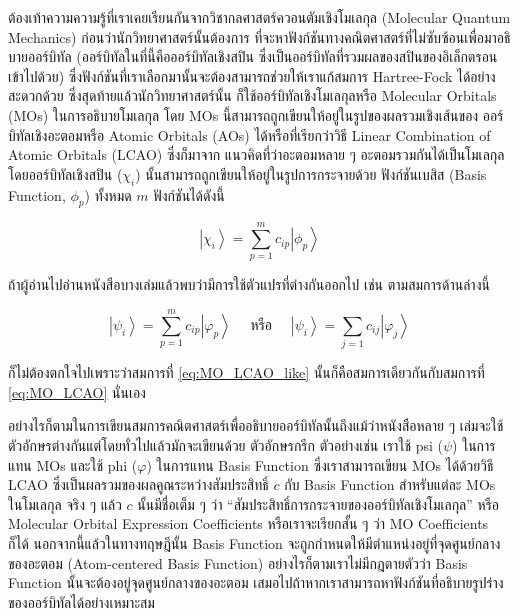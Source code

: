 ต้องเท้าความความรู้ที่เราเคยเรียนกันจากวิชากลศาสตร์ควอนตัมเชิงโมเลกุล (Molecular Quantum Mechanics) ก่อนว่านักวิทยาศาสตร์นั้นต้องการ%
ที่จะหาฟังก์ชันทางคณิตศาสตร์ที่ไม่ซับซ้อนเพื่อมาอธิบายออร์บิทัล (ออร์บิทัลในที่นี้คือออร์บิทัลเชิงสปิน ซึ่งเป็นออร์บิทัลที่รวมผลของสปินของอิเล็กตรอน%
เข้าไปด้วย) ซึ่งฟังก์ชันที่เราเลือกมานั้นจะต้องสามารถช่วยให้เราแก้สมการ Hartree-Fock ได้อย่างสะดวกด้วย ซึ่งสุดท้ายแล้วนักวิทยาศาสตร์นั้น%
ก็ใช้ออร์บิทัลเชิงโมเลกุลหรือ Molecular Orbitals (MOs) ในการอธิบายโมเลกุล โดย MOs นี้สามารถถูกเขียนให้อยู่ในรูปของผลรวมเชิงเส้นของ%
ออร์บิทัลเชิงอะตอมหรือ Atomic Orbitals (AOs) ได้หรือที่เรียกว่าวิธี Linear Combination of Atomic Orbitals (LCAO) ซึ่งก็มาจาก%
แนวคิดที่ว่าอะตอมหลาย ๆ อะตอมรวมกันได้เป็นโมเลกุล โดยออร์บิทัลเชิงสปิน ($\chi_{i}$) นั้นสามารถถูกเขียนให้อยู่ในรูปการกระจายด้วย%
ฟังก์ชันเบสิส (Basis Function, $\phi_p$) ทั้งหมด $m$ ฟังก์ชันได้ดังนี้

\begin{equation}
    \label{eq:MO_LCAO}
    \left|\chi_i\right\rangle = \sum_{p=1}^m c_{i p}\left|\phi_p\right\rangle
\end{equation}

\noindent ถ้าผู้อ่านไปอ่านหนังสือบางเล่มแล้วพบว่ามีการใช้ตัวแปรที่ต่างกันออกไป เช่น ตามสมการด้านล่างนี้

\begin{equation}
    \label{eq:MO_LCAO_like}
    \left|\psi_{i}\right\rangle = \sum_{p=1}^m c_{i p}\left|\varphi_{p}\right\rangle
    \quad \text{ หรือ } \quad 
    \left|\psi_{i}\right\rangle = \sum_{j=1} c_{i j}\left|\varphi_{j}\right\rangle
\end{equation}

\noindent ก็ไม่ต้องตกใจไปเพราะว่าสมการที่ \ref{eq:MO_LCAO_like} นั้นก็คือสมการเดียวกันกับสมการที่ \ref{eq:MO_LCAO} นั่นเอง

อย่างไรก็ตามในการเขียนสมการคณิตศาสตร์เพื่ออธิบายออร์บิทัลนั้นถึงแม้ว่าหนังสือหลาย ๆ เล่มจะใช้ตัวอักษรต่างกันแต่โดยทั่วไปแล้วมักจะเขียนด้วย%
ตัวอักษรกรีก ตัวอย่างเช่น เราใช้ psi ($\psi$) ในการแทน MOs และใช้ phi ($\varphi$) ในการแทน Basis Function ซึ่งเราสามารถเขียน 
MOs ได้ด้วยวิธี LCAO ซึ่งเป็นผลรวมของผลคูณระหว่างสัมประสิทธิ์ $c$ กับ Basis Function สำหรับแต่ละ MOs ในโมเลกุล จริง ๆ แล้ว $c$ 
นั้นมีชื่อเต็ม ๆ ว่า \enquote{สัมประสิทธิ์การกระจายของออร์บิทัลเชิงโมเลกุล} หรือ Molecular Orbital Expression Coefficients 
หรือเราจะเรียกสั้น ๆ ว่า MO Coefficients ก็ได้ นอกจากนี้แล้วในทางทฤษฎีนั้น Basis Function จะถูกกำหนดให้มีตำแหน่งอยู่ที่จุดศูนย์กลาง%
ของอะตอม (Atom-centered Basis Function) อย่างไรก็ตามเราไม่มีกฎตายตัวว่า Basis Function นั้นจะต้องอยู่จุดศูนย์กลางของอะตอม%
เสมอไปถ้าหากเราสามารถหาฟังก์ชันที่อธิบายรูปร่างของออร์บิทัลได้อย่างเหมาะสม


